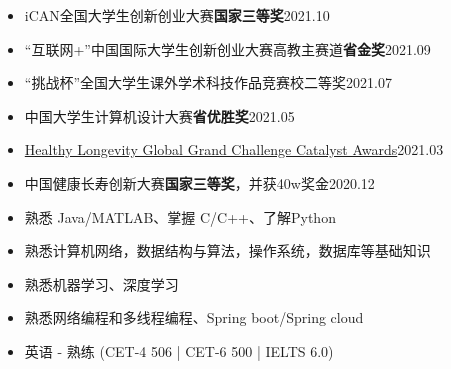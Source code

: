 
\begin{itemize}[topsep=0pt,itemsep=0pt,parsep=0pt,partopsep=0pt]
  \item iCAN全国大学生创新创业大赛\textbf{国家三等奖}\hfill 2021.10
  \item “互联网+”中国国际大学生创新创业大赛高教主赛道\textbf{省金奖}\hfill 2021.09
  \item “挑战杯”全国大学生课外学术科技作品竞赛校二等奖\hfill 2021.07
  \item 中国大学生计算机设计大赛\textbf{省优胜奖}\hfill 2021.05
  \item \href{https://healthylongevitychallenge.org/winners/sleep-guardian-an-rf-based-system-guarding-your-sleeping/}{Healthy Longevity Global Grand Challenge Catalyst Awards}\hfill 2021.03
  \item 中国健康长寿创新大赛\textbf{国家三等奖}，并获40w奖金\hfill 2020.12
\end{itemize}


\begin{itemize}[topsep=0pt,itemsep=0pt,parsep=0pt,partopsep=0pt]
  \item 熟悉 Java/MATLAB、掌握 C/C++、了解Python 
  \item 熟悉计算机网络，数据结构与算法，操作系统，数据库等基础知识
  \item 熟悉机器学习、深度学习
  \item 熟悉网络编程和多线程编程、Spring boot/Spring cloud
\end{itemize}

\begin{itemize}[topsep=0pt,itemsep=0pt,parsep=0pt,partopsep=0pt]
  \item 英语 - 熟练 (CET-4 506 | CET-6 500 | IELTS 6.0)
\end{itemize}



